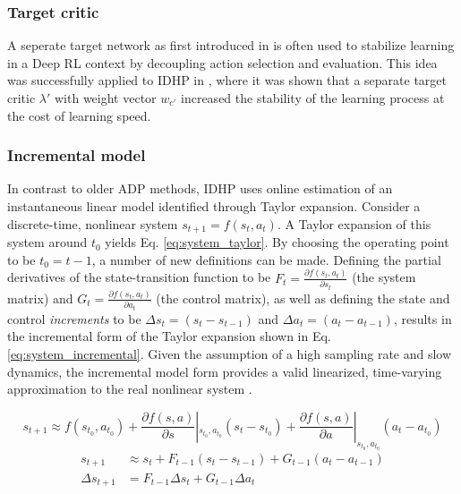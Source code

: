 \subsubsection{Target critic}
A seperate target network as first introduced in \cite{Mnih2015, Lillicrap2015} is often used to stabilize learning in a Deep RL context by decoupling action selection and evaluation. This idea was successfully applied to IDHP in \cite{Heyer2020}, where it was shown that a separate target critic $\lambda'$ with weight vector $w_{c'}$ increased the stability of the learning process at the cost of learning speed. 

\subsubsection{Incremental model} \label{ssec:incrementalrls}
In contrast to older ADP methods, IDHP uses online estimation of an instantaneous linear model identified through Taylor expansion. Consider a discrete-time, nonlinear system $s_{t+1} = f(s_t, a_t)$. A Taylor expansion of this system around $t_0$ yields Eq. \eqref{eq:system_taylor}. By choosing the operating point to be $t_0 = t-1$, a number of new definitions can be made. 
Defining the partial derivatives of the state-transition function to be $F_t = \frac{\partial f(s_t, a_t) }{\partial s_t }$  (the system matrix) and $G_t = \frac{\partial f(s_t, a_t) }{\partial a_t}$ (the control matrix), as well as defining the state and control \textit{increments} to be $\Delta s_t = (s_t - s_{t-1})$ and $\Delta a_t = (a_t - a_{t-1})$, results in the incremental form of the Taylor expansion shown in Eq. \eqref{eq:system_incremental}. Given the assumption of a high sampling rate and slow dynamics, the incremental model form provides a valid linearized, time-varying approximation to the real nonlinear system \cite{Zhou2016iADP}.

\begin{equation}
\label{eq:system_taylor}
    s_{t+1} \approx f(s_{t_0}, a_{t_0}) + \frac{\partial f(s, a) }{\partial s } |_{s_{t_0}, a_{t_0}} (s_t - s_{t_0}) + \frac{\partial f(s, a) }{\partial a } |_{s_{t_0}, a_{t_0}} (a_t - a_{t_0})
\end{equation}
\begin{equation} \label{eq:system_incremental}
    \begin{split}
        s_{t+1} &\approx s_t + F_{t-1} (s_t - s_{t-1}) + G_{t-1} (a_t - a_{t-1}) \\
        \Delta s_{t+1} &= F_{t-1} \Delta s_t + G_{t-1} \Delta a_t
    \end{split}
\end{equation}

